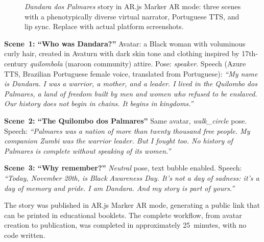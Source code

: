 \documentclass[conference]{IEEEtran}
\begin{document}
\begin{figure}[htbp]
  \centering
  \caption{\textit{Dandara dos Palmares} story in AR.js Marker AR mode: three
    scenes with a phenotypically diverse virtual narrator, Portuguese TTS,
    and lip sync. Replace with actual platform screenshots.}
  \label{fig:dandara}
\end{figure}

\textbf{Scene~1: ``Who was Dandara?''} Avatar: a Black woman with voluminous
curly hair, created in Avaturn with dark skin tone and clothing inspired by
17th-century \textit{quilombola} (maroon community) attire. Pose:
\textit{speaker}. Speech (Azure TTS, Brazilian Portuguese female voice,
translated from Portuguese): \textit{``My name is Dandara. I was a warrior, a
mother, and a leader. I lived in the Quilombo dos Palmares, a land of freedom
built by men and women who refused to be enslaved. Our history does not begin
in chains. It begins in kingdoms.''}

\textbf{Scene~2: ``The Quilombo dos Palmares''} Same avatar, \textit{walk\_circle}
pose. Speech: \textit{``Palmares was a nation of more than twenty thousand
free people. My companion Zumbi was the warrior leader. But I fought too. No
history of Palmares is complete without speaking of its women.''}

\textbf{Scene~3: ``Why remember?''} \textit{Neutral} pose, text bubble enabled.
Speech: \textit{``Today, November 20th, is Black Awareness Day. It's not a day
of sadness: it's a day of memory and pride. I am Dandara. And my story is
part of yours.''}

The story was published in AR.js Marker AR mode, generating a public link
that can be printed in educational booklets. The complete workflow, from
avatar creation to publication, was completed in approximately 25~minutes,
with no code written.
\end{document}
